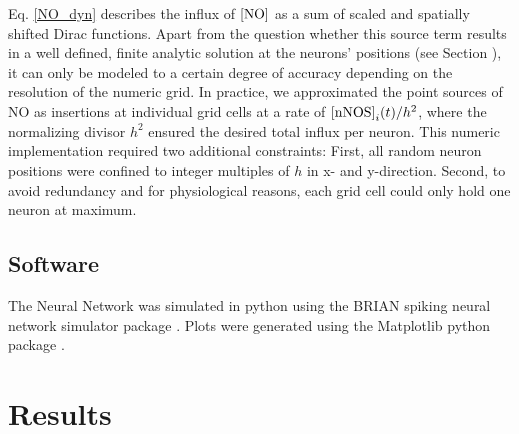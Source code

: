 \documentclass[10pt,letterpaper]{article}
\begin{document}
Eq. \eqref{NO_dyn} describes the influx of $\rm [NO]$ as a sum of scaled and spatially shifted Dirac functions. Apart from the question whether this source term results in a well defined, finite analytic solution at the neurons' positions (see Section \textit{}), it can only be modeled to a certain degree of accuracy depending on the resolution of the numeric grid. In practice, we approximated the point sources of NO as insertions at individual grid cells at a rate of ${\rm [nNOS]}_i(t) / h^2$, where the normalizing divisor $h^2$ ensured the desired total influx per neuron. This numeric implementation required two additional constraints: First, all random neuron positions were confined to integer multiples of $h$ in x- and y-direction. Second, to avoid redundancy and for physiological reasons, each grid cell could only hold one neuron at maximum.

\subsection*{Software}
The Neural Network was simulated in python using the BRIAN spiking neural network simulator package \cite{Briansim}. Plots were generated using the Matplotlib python package \cite{Matplotlib}.

\section*{Results}
\end{document}
